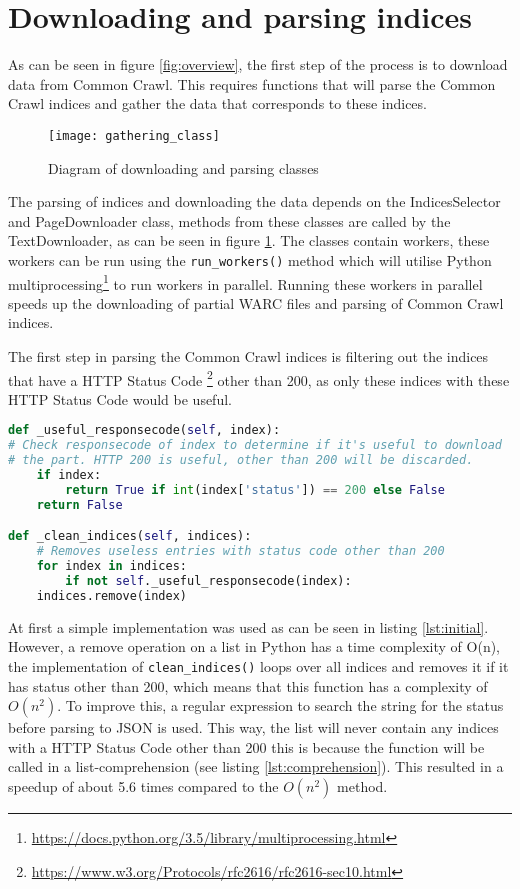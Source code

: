 \section{Downloading and parsing indices}

As can be seen in figure \ref{fig:overview}, the first step of the process is to download data from Common Crawl. This requires functions that will parse the Common Crawl indices and gather the data that corresponds to these indices. 

\begin{figure}[H]
\centering
\texttt{[image: gathering\_class]}
\caption{Diagram of downloading and parsing classes}
\label{fig:gathering_class}
\end{figure}

The parsing of indices and downloading the data depends on the IndicesSelector and PageDownloader class, methods from these classes are called by the TextDownloader, as can be seen in figure \ref{fig:gathering_class}. The classes contain workers, these workers can be run  using the \texttt{run\_workers()} method which will utilise Python multiprocessing\footnote{\url{https://docs.python.org/3.5/library/multiprocessing.html}} to run workers in parallel. Running these workers in parallel speeds up the downloading of partial WARC files and parsing of Common Crawl indices.

The first step in parsing the Common Crawl indices is filtering out the indices that have a HTTP Status Code \footnote{\url{https://www.w3.org/Protocols/rfc2616/rfc2616-sec10.html}} other than 200, as only these indices with these HTTP Status Code would be useful. 

\begin{lstlisting}[language=Python, caption=Initial implementation, label={lst:initial}]
def _useful_responsecode(self, index):
# Check responsecode of index to determine if it's useful to download
# the part. HTTP 200 is useful, other than 200 will be discarded.
    if index:
        return True if int(index['status']) == 200 else False
    return False

def _clean_indices(self, indices):
    # Removes useless entries with status code other than 200
    for index in indices:
        if not self._useful_responsecode(index):
    indices.remove(index)
\end{lstlisting}

At first a simple implementation was used as can be seen in listing \ref{lst:initial}. However, a remove operation on a list in Python has a time complexity of O(n), the implementation of \texttt{clean\_indices()} loops over all indices and removes it if it has status other than 200, which means that this function has a complexity of $O(n^2)$. To improve this, a regular expression to search the string for the status before parsing to JSON is used. This way, the list will never contain any indices with a HTTP Status Code other than 200 this is because the function will be called in a list-comprehension (see listing \ref{lst:comprehension}). This resulted in a speedup of about 5.6 times compared to the $O(n^2)$ method.


